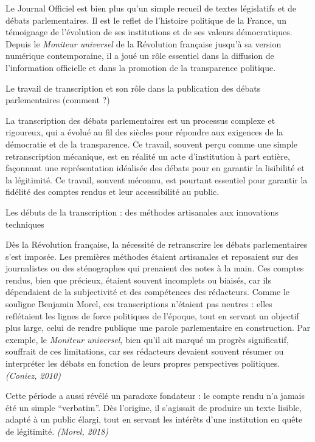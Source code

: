Le Journal Officiel est bien plus qu'un simple recueil de textes législatifs et de débats parlementaires. Il est le reflet de l'histoire politique de la France, un témoignage de l'évolution de ses institutions et de ses valeurs démocratiques. Depuis le \emph{Moniteur universel} de la Révolution française jusqu'à sa version numérique contemporaine, il a joué un rôle essentiel dans la diffusion de l'information officielle et dans la promotion de la transparence politique.

Le travail de transcription et son rôle dans la publication des débats parlementaires (comment ?)

La transcription des débats parlementaires est un processus complexe et rigoureux, qui a évolué au fil des siècles pour répondre aux exigences de la démocratie et de la transparence. Ce travail, souvent perçu comme une simple retranscription mécanique, est en réalité un acte d’institution à part entière, façonnant une représentation idéalisée des débats pour en garantir la lisibilité et la légitimité. Ce travail, souvent méconnu, est pourtant essentiel pour garantir la fidélité des comptes rendus et leur accessibilité au public.

 Les débuts de la transcription : des méthodes artisanales aux innovations techniques

Dès la Révolution française, la nécessité de retranscrire les débats parlementaires s'est imposée. Les premières méthodes étaient artisanales et reposaient sur des journalistes ou des sténographes qui prenaient des notes à la main. Ces comptes rendus, bien que précieux, étaient souvent incomplets ou biaisés, car ils dépendaient de la subjectivité et des compétences des rédacteurs. Comme le souligne Benjamin Morel, ces transcriptions n’étaient pas neutres : elles reflétaient les lignes de force politiques de l’époque, tout en servant un objectif plus large, celui de rendre publique une parole parlementaire en construction. Par exemple, le \emph{Moniteur universel}, bien qu'il ait marqué un progrès significatif, souffrait de ces limitations, car ses rédacteurs devaient souvent résumer ou interpréter les débats en fonction de leurs propres perspectives politiques. \emph{(Coniez, 2010)}

Cette période a aussi révélé un paradoxe fondateur : le compte rendu n’a jamais été un simple \enquote{verbatim}. Dès l’origine, il s’agissait de produire un texte lisible, adapté à un public élargi, tout en servant les intérêts d’une institution en quête de légitimité. \emph{(Morel, 2018)}

